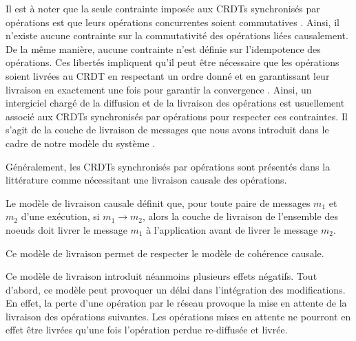 Il est à noter que la seule contrainte imposée aux \acp{CRDT} synchronisés par opérations est que leurs opérations concurrentes soient commutatives \cite{shapiro_2011_crdt}.
Ainsi, il n'existe aucune contrainte sur la commutativité des opérations liées causalement.
De la même manière, aucune contrainte n'est définie sur l'idempotence des opérations.
Ces libertés impliquent qu'il peut être nécessaire que les opérations soient livrées au \ac{CRDT} en respectant un ordre donné et en garantissant leur livraison en exactement une fois pour garantir la convergence \cite{2018-crdts-overview-preguica}.
Ainsi, un intergiciel chargé de la diffusion et de la livraison des opérations est usuellement associé aux \acp{CRDT} synchronisés par opérations pour respecter ces contraintes.
Il s'agit de la couche de livraison de messages que nous avons introduit dans le cadre de notre modèle du système .

Généralement, les \acp{CRDT} synchronisés par opérations sont présentés dans la littérature comme nécessitant une livraison causale des opérations.

\begin{definition}
  \label{def:causal-delivery}
  Le modèle de livraison causale définit que, pour toute paire de messages $m_1$ et $m_2$ d'une exécution, si $m_1 \to m_2$, alors la couche de livraison de l'ensemble des noeuds doit livrer le message $m_1$ à l'application avant de livrer le message $m_2$.
\end{definition}

Ce modèle de livraison permet de respecter le modèle de cohérence causale.

Ce modèle de livraison introduit néanmoins plusieurs effets négatifs.
Tout d'abord, ce modèle peut provoquer un délai dans l'intégration des modifications.
En effet, la perte d'une opération par le réseau provoque la mise en attente de la livraison des opérations suivantes.
Les opérations mises en attente ne pourront en effet être livrées qu'une fois l'opération perdue re-diffusée et livrée.

